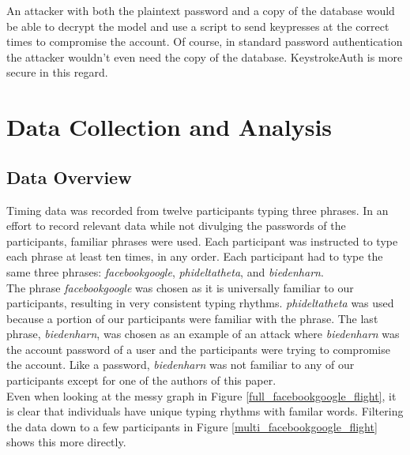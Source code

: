 \documentclass{article}
\begin{document}
An attacker with both the plaintext password and a copy of the database would be able to decrypt the model and use a script to send keypresses at the correct times to compromise the account. 
Of course, in standard password authentication the attacker wouldn't even need the copy of the database. KeystrokeAuth is more secure in this regard.



\section{Data Collection and Analysis}

\subsection{Data Overview}
Timing data was recorded from twelve participants typing three phrases. In an effort to record relevant data while not divulging the passwords of the participants, familiar phrases were used. Each participant was instructed to type each phrase at least ten times, in any order. Each participant had to type the same three phrases: \textit{facebookgoogle}, \textit{phideltatheta}, and \textit{biedenharn}.\\

The phrase \textit{facebookgoogle} was chosen as it is universally familiar to our participants, resulting in very consistent typing rhythms. \textit{phideltatheta} was used because a portion of our participants were familiar with the phrase. The last phrase, \textit{biedenharn}, was chosen as an example of an attack where \textit{biedenharn} was the account password of a user and the participants were trying to compromise the account. Like a password, \textit{biedenharn} was not familiar to any of our participants except for one of the authors of this paper.\\

Even when looking at the messy graph in Figure \ref{full_facebookgoogle_flight}, it is clear that individuals have unique typing rhythms with familar words. Filtering the data down to a few participants in Figure \ref{multi_facebookgoogle_flight} shows this more directly.
\end{document}
